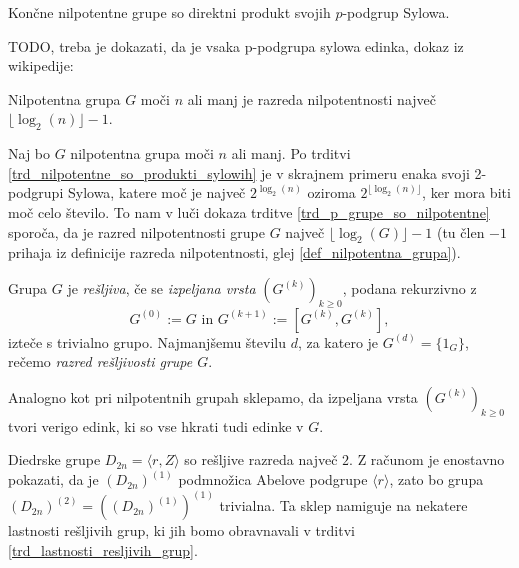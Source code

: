 \begin{trditev}\label{trd_nilpotentne_so_produkti_sylowih}
    Končne nilpotentne grupe so direktni produkt svojih $p$-podgrup Sylowa.
\end{trditev}
\begin{dokaz}
    TODO, treba je dokazati, da je vsaka p-podgrupa sylowa edinka, dokaz iz wikipedije: %
\end{dokaz}
\begin{definicija}

\begin{posledica}\label{psl_ocena_razreda_nilpotentnosti}
    Nilpotentna grupa $G$ moči $n$ ali manj je razreda nilpotentnosti največ $\lfloor \log_2(n) \rfloor - 1$.
\end{posledica}
\begin{dokaz}
    Naj bo $G$ nilpotentna grupa moči $n$ ali manj. Po trditvi \ref{trd_nilpotentne_so_produkti_sylowih} je v skrajnem primeru enaka svoji 2-podgrupi Sylowa, katere moč je največ $2^{\log_2(n)}$ oziroma $2^{\lfloor \log_2(n) \rfloor}$, ker  mora biti moč celo število.
    To nam v luči dokaza trditve \ref{trd_p_grupe_so_nilpotentne} sporoča, da je razred nilpotentnosti grupe $G$ največ $\lfloor \log_2(G) \rfloor - 1$ (tu člen $-1$ prihaja iz definicije razreda nilpotentnosti, glej \ref{def_nilpotentna_grupa}).  
\end{dokaz}


    \label{def_resljiva_grupa}
    Grupa $G$ je \emph{rešljiva}, če se \emph{izpeljana vrsta} $(G^{(k)})_{k \ge 0}$, podana rekurzivno z \begin{equation*}
        G^{(0)} := G \text{ in } G^{(k + 1)} := [G^{(k)}, G^{(k)}],
        \end{equation*}  
        izteče s trivialno grupo. Najmanjšemu številu $d$, za katero je $G^{(d)} = \{ 1_G \}$, rečemo \emph{razred rešljivosti grupe $G$}.    
    \end{definicija}

    Analogno kot pri nilpotentnih grupah sklepamo, da izpeljana vrsta $(G^{(k)})_{k \ge 0}$ tvori verigo edink, ki so vse hkrati tudi edinke v $G$.
    
    \begin{primer}
        Diedrske grupe $D_{2n} = \langle r , Z \rangle$ so rešljive razreda največ $2$. Z računom je enostavno pokazati, da je $(D_{2n})^{(1)}$ podmnožica Abelove podgrupe $\langle r \rangle$, zato bo grupa $(D_{2n})^{(2)} = ((D_{2n})^{(1)})^{(1)}$ trivialna.
        Ta sklep namiguje na nekatere lastnosti rešljivih grup, ki jih bomo obravnavali v trditvi \ref{trd_lastnosti_resljivih_grup}. 
    \end{primer}

